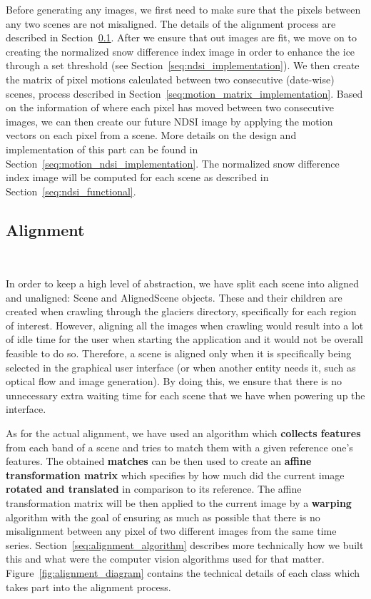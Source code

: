 \documentclass[12pt, a4paper]{report}
\begin{document}
	\par Before generating any images, we first need to make sure that the pixels between any two scenes are not misaligned. The details of the alignment process are described in Section~\ref{seq:alignment_implementation}. After we ensure that out images are fit, we move on to creating the normalized snow difference index image in order to enhance the ice through a set threshold (see Section~\ref{seq:ndsi_implementation}). We then create the matrix of pixel motions calculated between two consecutive (date-wise) scenes, process described in Section~\ref{seq:motion_matrix_implementation}. Based on the information of where each pixel has moved between two consecutive images, we can then create our future NDSI image by applying the motion vectors on each pixel from a scene. More details on the design and implementation of this part can be found in Section~\ref{seq:motion_ndsi_implementation}.
	The normalized snow difference index image will be computed for each scene as described in Section~\ref{seq:ndsi_functional}.
	
	
	\subsection{Alignment}
	\label{seq:alignment_implementation}\
	
	\par In order to keep a high level of abstraction, we have split each scene into aligned and unaligned: Scene and AlignedScene objects. These and their children are created when crawling through the glaciers directory, specifically for each region of interest. However, aligning all the images when crawling would result into a lot of idle time for the user when starting the application and it would not be overall feasible to do so. Therefore, a scene is aligned only when it is specifically being selected in the graphical user interface (or when another entity needs it, such as optical flow and image generation). By doing this, we ensure that there is no unnecessary extra waiting time for each scene that we have when powering up the interface.
	
	\par As for the actual alignment, we have used an algorithm which \textbf{collects features} from each band of a scene and tries to match them with a given reference one's features. The obtained \textbf{matches} can be then used to create an \textbf{affine transformation matrix} which specifies by how much did the current image \textbf{rotated and translated} in comparison to its reference. The affine transformation matrix will be then applied to the current image by a \textbf{warping} algorithm with the goal of ensuring as much as possible that there is no misalignment between any pixel of two different images from the same time series. Section~\ref{seq:alignment_algorithm} describes more technically how we built this and what were the computer vision algorithms used for that matter. Figure~\ref{fig:alignment_diagram} contains the technical details of each class which takes part into the alignment process.
	
\end{document}
